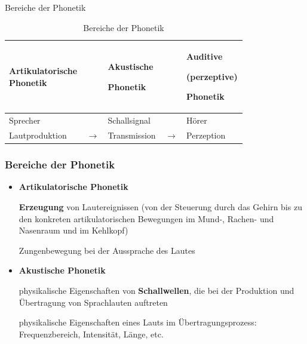 
\begin{frame}{Bereiche der Phonetik}

	\begin{table}
	\centering 
	
		\begin{tabular}{p{0.23\linewidth}p{0.05\linewidth}p{0.23\linewidth}p{0.05\linewidth}p{0.23\linewidth}}
			\hline
			\textbf{Artikulatorische Phonetik} & & \textbf{Akustische}\par \textbf{Phonetik} & & \textbf{Auditive}\par \textbf{(perzeptive)}\par \textbf{Phonetik} \\
			\hline
  			Sprecher & & Schallsignal & & Hörer \\
			\hline
			Lautproduktion & $\rightarrow$ & Transmission & $\rightarrow$ & Perzeption\\
			\hline
		\end{tabular}
		
	\caption{Bereiche der Phonetik \citep{Ramers08a}} 
	\end{table}	
		
\end{frame}




\begin{frame}
\frametitle{Bereiche der Phonetik}

	\begin{itemize}
		\item \textbf{Artikulatorische Phonetik}
		
\textbf{Erzeugung} von Lautereignissen (von der Steuerung durch das Gehirn bis zu den konkreten artikulatorischen Bewegungen im Mund-, Rachen- und Nasenraum und im Kehlkopf)

			\ea Zungenbewegung bei der Aussprache des Lautes \textipa{[ \t{tS} ]}
			\z

\pause 
		
		\item \textbf{Akustische Phonetik}
		
                       physikalische Eigenschaften von \textbf{Schallwellen}, die bei der Produktion und Übertragung von Sprachlauten auftreten

			\ea physikalische Eigenschaften eines Lauts im Übertragungsprozess: Frequenzbereich, Intensität, Länge, etc.
			\z

	\end{itemize}

\end{frame}


